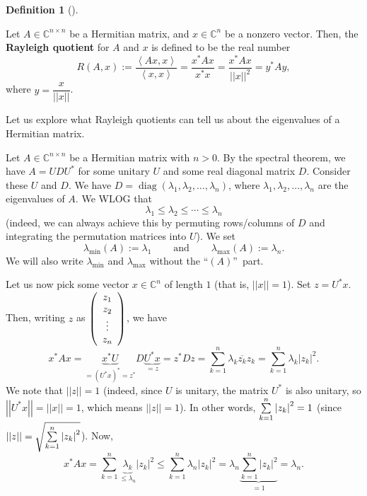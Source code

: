 \documentclass[numbers=enddot,12pt,final,onecolumn,notitlepage]{scrartcl}%
\numberwithin{exer}{subsection}
\theoremstyle{definition}
\newtheorem{defi}[theo]{Definition}
\newenvironment{definition}[1][]
{\begin{defi}[#1]\begin{leftbar}}
{\end{leftbar}\end{defi}}
\let\sumnonlimits\sum
\renewcommand{\sum}{\sumnonlimits\limits}
\begin{document}
\begin{definition}
Let $A\in\mathbb{C}^{n\times n}$ be a Hermitian matrix, and $x\in
\mathbb{C}^{n}$ be a nonzero vector. Then, the \textbf{Rayleigh quotient} for
$A$ and $x$ is defined to be the real number%
\[
R\left(  A,x\right)  :=\dfrac{\left\langle Ax,x\right\rangle }{\left\langle
x,x\right\rangle }=\dfrac{x^{\ast}Ax}{x^{\ast}x}=\dfrac{x^{\ast}Ax}{\left\vert
\left\vert x\right\vert \right\vert ^{2}}=y^{\ast}Ay,
\]
where $y=\dfrac{x}{\left\vert \left\vert x\right\vert \right\vert }$.
\end{definition}

Let us explore what Rayleigh quotients can tell us about the eigenvalues of a
Hermitian matrix.

Let $A\in\mathbb{C}^{n\times n}$ be a Hermitian matrix with $n>0$. By the
spectral theorem, we have $A=UDU^{\ast}$ for some unitary $U$ and some real
diagonal matrix $D$. Consider these $U$ and $D$. We have
$D=\operatorname*{diag}\left(  \lambda_{1},\lambda_{2},\ldots,\lambda
_{n}\right)  $, where $\lambda_{1},\lambda_{2},\ldots,\lambda_{n}$ are the
eigenvalues of $A$. We WLOG that
\[
\lambda_{1}\leq\lambda_{2}\leq\cdots\leq\lambda_{n}%
\]
(indeed, we can always achieve this by permuting rows/columns of $D$ and
integrating the permutation matrices into $U$). We set%
\[
\lambda_{\min}\left(  A\right)  :=\lambda_{1}\ \ \ \ \ \ \ \ \ \ \text{and}%
\ \ \ \ \ \ \ \ \ \ \lambda_{\max}\left(  A\right)  :=\lambda_{n}.
\]
We will also write $\lambda_{\min}$ and $\lambda_{\max}$ without the
\textquotedblleft$\left(  A\right)  $\textquotedblright\ part.

Let us now pick some vector $x\in\mathbb{C}^{n}$ of length $1$ (that is,
$\left\vert \left\vert x\right\vert \right\vert =1$). Set $z=U^{\ast}x$. Then,
writing $z$ as $\left(
\begin{array}
[c]{c}%
z_{1}\\
z_{2}\\
\vdots\\
z_{n}%
\end{array}
\right)  $, we have%
\[
x^{\ast}Ax=\underbrace{x^{\ast}U}_{=\left(  U^{\ast}x\right)  ^{\ast}=z^{\ast
}}D\underbrace{U^{\ast}x}_{=z}=z^{\ast}Dz=\sum_{k=1}^{n}\lambda_{k}%
\overline{z_{k}}z_{k}=\sum_{k=1}^{n}\lambda_{k}\left\vert z_{k}\right\vert
^{2}.
\]
We note that $\left\vert \left\vert z\right\vert \right\vert =1$ (indeed,
since $U$ is unitary, the matrix $U^{\ast}$ is also unitary, so $\left\vert
\left\vert U^{\ast}x\right\vert \right\vert =\left\vert \left\vert
x\right\vert \right\vert =1$, which means $\left\vert \left\vert z\right\vert
\right\vert =1$). In other words, $\sum\limits_{k=1}^{n}\left\vert
z_{k}\right\vert ^{2}=1$ (since $\left\vert \left\vert z\right\vert
\right\vert =\sqrt{\sum\limits_{k=1}^{n}\left\vert z_{k}\right\vert ^{2}}$).
Now,%
\[
x^{\ast}Ax=\sum_{k=1}^{n}\underbrace{\lambda_{k}}_{\leq\lambda_{n}}\left\vert
z_{k}\right\vert ^{2}\leq\sum_{k=1}^{n}\lambda_{n}\left\vert z_{k}\right\vert
^{2}=\lambda_{n}\underbrace{\sum_{k=1}^{n}\left\vert z_{k}\right\vert ^{2}%
}_{=1}=\lambda_{n}.
\]
\end{document}
